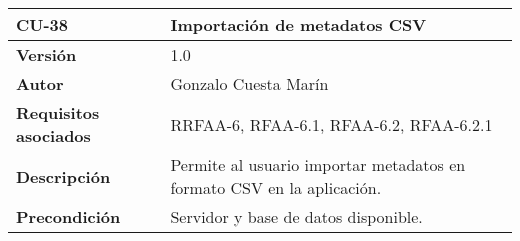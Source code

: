 \begin{longtable}[]{@{}ll@{}}
\toprule
\begin{minipage}[b]{0.20\columnwidth}\raggedright
\textbf{CU-38}\strut
\end{minipage} & \begin{minipage}[b]{0.75\columnwidth}\raggedright
\textbf{Importación de metadatos CSV}\strut
\end{minipage}\tabularnewline
\midrule
\endhead
\begin{minipage}[t]{0.20\columnwidth}\raggedright
\textbf{Versión}\strut
\end{minipage} & \begin{minipage}[t]{0.75\columnwidth}\raggedright
1.0\strut
\end{minipage}\tabularnewline
\begin{minipage}[t]{0.20\columnwidth}\raggedright
\textbf{Autor}\strut
\end{minipage} & \begin{minipage}[t]{0.75\columnwidth}\raggedright
Gonzalo Cuesta Marín\strut
\end{minipage}\tabularnewline
\begin{minipage}[t]{0.20\columnwidth}\raggedright
\textbf{Requisitos asociados}\strut
\end{minipage} & \begin{minipage}[t]{0.75\columnwidth}\raggedright
RRFAA-6, RFAA-6.1, RFAA-6.2, RFAA-6.2.1\strut
\end{minipage}\tabularnewline
\begin{minipage}[t]{0.20\columnwidth}\raggedright
\textbf{Descripción}\strut
\end{minipage} & \begin{minipage}[t]{0.75\columnwidth}\raggedright
Permite al usuario importar metadatos en formato CSV en la
aplicación.\strut
\end{minipage}\tabularnewline
\begin{minipage}[t]{0.20\columnwidth}\raggedright
\textbf{Precondición}\strut
\end{minipage} & \begin{minipage}[t]{0.75\columnwidth}\raggedright
Servidor y base de datos disponible.


\end{minipage}
\end{longtable}
